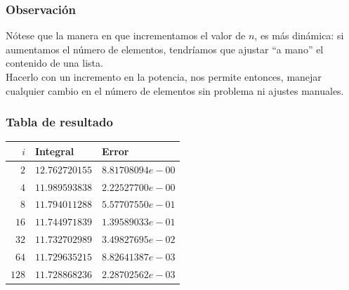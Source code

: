 \begin{frame}
\frametitle{Observación}
Nótese que la manera en que incrementamos el valor de $n$, es más dinámica: si aumentamos el número de elementos, tendríamos que ajustar \enquote{a mano} el contenido de una lista.
\\
\bigskip
Hacerlo con un incremento en la potencia, nos permite entonces, manejar cualquier cambio en el número de elementos sin problema ni ajustes manuales.
\end{frame}
\begin{frame}
\frametitle{Tabla de resultado}
\fontsize{12}{12}\selectfont
\begin{center}
\begin{tabular}{r | l | l} 
$i$ & Integral & Error \\ \hline
$2$ & $12.762720155$ & $8.81708094e-00$ \\ \hline
$4$ & $11.989593838$ & $2.22527700e-00$ \\ \hline
$8$ & $11.794011288$ & $5.57707550e-01$ \\ \hline
$16$ & $11.744971839$ & $1.39589033e-01$ \\ \hline
$32$ & $11.732702989$ & $3.49827695e-02$ \\ \hline
$64$ & $11.729635215$ & $8.82641387e-03$ \\ \hline
$128$ & $11.728868236$ & $2.28702562e-03$
\end{tabular}
\end{center}
\end{frame}
